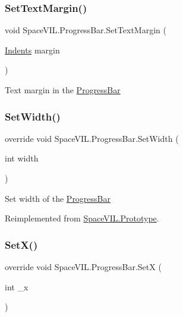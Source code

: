 \subsubsection{\texorpdfstring{Set\+Text\+Margin()}{SetTextMargin()}}
{\footnotesize\ttfamily void Space\+V\+I\+L.\+Progress\+Bar.\+Set\+Text\+Margin (\begin{DoxyParamCaption}\item[{\mbox{\hyperlink{struct_space_v_i_l_1_1_decorations_1_1_indents}{Indents}}}]{margin }\end{DoxyParamCaption})}



Text margin in the \mbox{\hyperlink{class_space_v_i_l_1_1_progress_bar}{Progress\+Bar}} 

\mbox{\label{class_space_v_i_l_1_1_progress_bar_af970d2e5eed12540914beb9978e25665}} 
\subsubsection{\texorpdfstring{Set\+Width()}{SetWidth()}}
{\footnotesize\ttfamily override void Space\+V\+I\+L.\+Progress\+Bar.\+Set\+Width (\begin{DoxyParamCaption}\item[{int}]{width }\end{DoxyParamCaption})\hspace{0.3cm}{\ttfamily [virtual]}}



Set width of the \mbox{\hyperlink{class_space_v_i_l_1_1_progress_bar}{Progress\+Bar}} 



Reimplemented from \mbox{\hyperlink{class_space_v_i_l_1_1_prototype_a6a4f1b9581f4d18f1c3a3e287d4b2a2b}{Space\+V\+I\+L.\+Prototype}}.

\mbox{\label{class_space_v_i_l_1_1_progress_bar_a5ceeeefd0b4fb56ba6226d294e784a3e}} 
\subsubsection{\texorpdfstring{Set\+X()}{SetX()}}
{\footnotesize\ttfamily override void Space\+V\+I\+L.\+Progress\+Bar.\+SetX (\begin{DoxyParamCaption}\item[{int}]{\+\_\+x }\end{DoxyParamCaption})\hspace{0.3cm}{\ttfamily [virtual]}}



